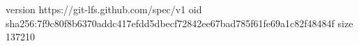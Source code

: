 version https://git-lfs.github.com/spec/v1
oid sha256:7f9c80f8b6370addc417efdd5dbecf72842ee67bad785f61fe69a1c82f48484f
size 137210
